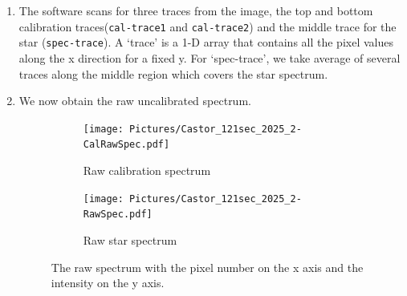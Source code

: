\documentclass[12pt,a4paper]{article}
\begin{document}
      \begin{enumerate}
        \item The software scans for three traces from the image, the top and bottom calibration traces(\texttt{cal-trace1} and \texttt{cal-trace2}) and the middle trace for the star (\texttt{spec-trace}). A `trace' is a 
              1-D array that contains all the pixel values along the x direction for a fixed y. For `spec-trace', we take average of several traces along the middle region which covers the star spectrum. 
        \item We now obtain the raw uncalibrated spectrum.
          \begin{figure}[H]
            \centering
            \begin{subfigure}{0.49\textwidth}
              \centering
              \texttt{[image: Pictures/Castor\_121sec\_2025\_2-CalRawSpec.pdf]}
              \caption{Raw calibration spectrum}
              \label{fig:rawcalspec}  
            \end{subfigure}
            \begin{subfigure}{0.49\textwidth}
              \centering
              \texttt{[image: Pictures/Castor\_121sec\_2025\_2-RawSpec.pdf]}
              \caption{Raw star spectrum}
              \label{fig:rawstarspec}
            \end{subfigure}
            \caption{The raw spectrum with the pixel number on the x axis and the intensity on the y axis. }
          \end{figure}


\end{enumerate}
\end{document}
